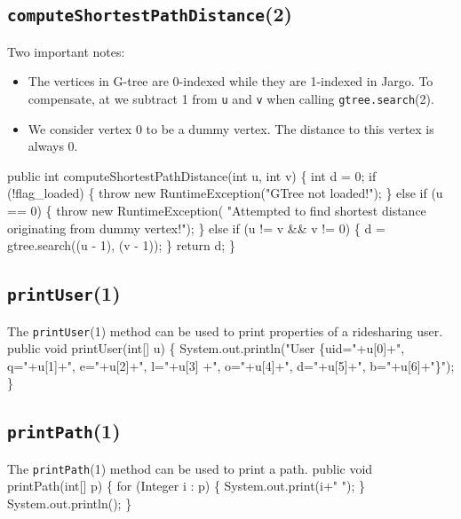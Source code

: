 \documentclass{article}
\def\nwendcode{\endtrivlist \endgroup}      %
\let\nwdocspar=\par
\begin{document}
\subsection{{\tt{}computeShortestPathDistance}(2)}
Two important notes:
\begin{itemize}
\item The vertices in G-tree are 0-indexed while they are 1-indexed in Jargo.
To compensate, at we subtract 1 from {\tt{}u} and {\tt{}v} when calling
{\tt{}gtree.search}(2).
\item We consider vertex 0 to be a dummy vertex. The distance to this vertex
is always 0.
\end{itemize}
\nwenddocs{}\endmoddef{}
public int computeShortestPathDistance(int u, int v) \{
  int d = 0;
  if (!flag_loaded) \{
    throw new RuntimeException("GTree not loaded!");
  \} else if (u == 0) \{
    throw new RuntimeException(
        "Attempted to find shortest distance originating from dummy vertex!");
  \} else if (u != v && v != 0) \{
    d = gtree.search((u - 1), (v - 1));
  \}
  return d;
\}
\nwendcode{}\nwdocspar

\subsection{{\tt{}\protect{}printUser}(1)}
The {\tt{}\protect{}printUser}(1) method can be used to print properties of a ridesharing
user.
\nwenddocs{}\endmoddef{}
public void printUser(int[] u) \{
  System.out.println("User \{uid="+u[0]+", q="+u[1]+", e="+u[2]+", l="+u[3]
    +", o="+u[4]+", d="+u[5]+", b="+u[6]+"\}");
\}
\eatline
{}\nwendcode{}\nwdocspar
\subsection{{\tt{}\protect{}printPath}(1)}
The {\tt{}\protect{}printPath}(1) method can be used to print a path.
\nwenddocs{}\endmoddef{}
public void printPath(int[] p) \{
  for (Integer i : p) \{
    System.out.print(i+" ");
  \}
  System.out.println();
\}
\eatline
{}\nwendcode{}\nwdocspar
\end{document}
